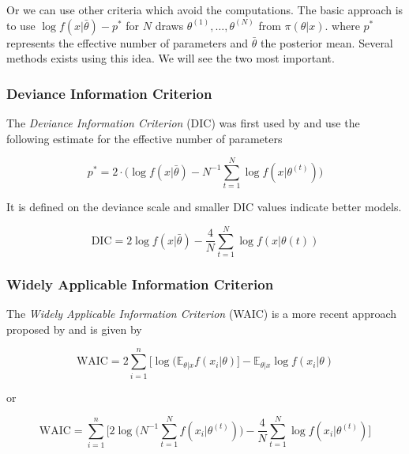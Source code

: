 \documentclass[11pt,a4paper,openany ]{book}
\begin{document}
\citet{Vehtari_practical_2016}


Or we can use other criteria which avoid the computations. The basic approach is to use  $\log f(x|\bar{\theta})-p^*$ for $N$ draws $\theta^{(1)},\dots,\theta^{(N)}$ from $\pi(\theta|x)$. where $p^*$ represents the effective number of parameters and $\bar{\theta}$ the posterior mean. Several methods exists using this idea. We will see the two most important.

\subsubsection*{Deviance Information Criterion}

The \emph{Deviance Information Criterion}
(DIC) was first used by \citet{Spiegelhalter_bayesian_2002} and use the following estimate for the effective number of parameters 

\begin{equation}
p^*=2\cdot \bigg(\log f(x|\bar{\theta})-N^{-1}\sum_{t=1}^N\log f(x|\theta^{(t)})\bigg)
\end{equation}

It is defined on the deviance scale and smaller DIC values indicate better models.

\begin{equation}
\text{DIC}= 2\log f(x|\bar{\theta}) - \frac{4}{N} \sum_{t=1}^N\log f(x|\theta{(t)})
\end{equation}



\subsubsection*{Widely Applicable
Information Criterion}

The \emph{Widely Applicable Information Criterion} (WAIC) is a more recent approach proposed by \citet{Watanabe_asymptotic_2010} and is given by 


\begin{equation}
\text{WAIC}= 2 \sum_{i=1}^n\big[\log(\mathbb{E}_{\theta|x}f(x_i|\theta)\big]- \mathbb{E}_{\theta|x}\log f(x_i|\theta) 
\end{equation}

or 

\begin{equation}
\text{WAIC} = \sum_{i=1}^n\Bigg[2\log \bigg(N^{-1}\sum_{t=1}^N f(x_i|\theta^{(t)})\bigg)-\frac{4}{N}\sum_{t=1}^N\log f(x_i|\theta^{(t)})\Bigg]
\end{equation}
\end{document}
